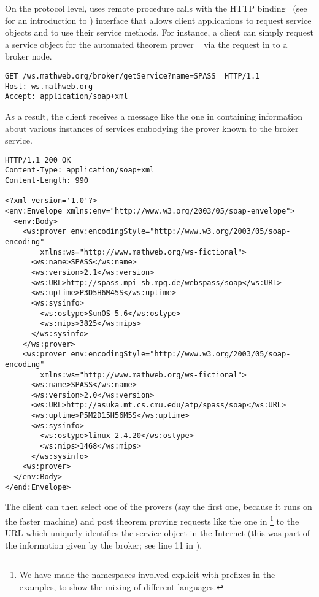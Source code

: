 \begin{omgroup}[id=rpc,short=Communication between Systems]
On the protocol level, {\mathwebws} uses {\soap} remote procedure calls with the HTTP
binding~\cite{GudHad:soapad03} (see~\cite{Mitra:soapPrimer03} for an introduction to
{\soap}) interface that allows client applications to request service objects and to use
their service methods. For instance, a client can simply request a service object for the
automated theorem prover {\spass}~\cite{Weidenbach:sv97} via the {\http} {}
request in {} to a {\mathwebws} broker node.

\begin{lstlisting}[label=lst:discover-spass,
          caption={Discovering Automated Theorem Provers (Request)}]
GET /ws.mathweb.org/broker/getService?name=SPASS  HTTP/1.1
Host: ws.mathweb.org
Accept: application/soap+xml
\end{lstlisting}

As a result, the client receives a {\soap} message like the one in
{} containing information about various instances of
services embodying the {\spass} prover known to the broker service.

\begin{lstlisting}[label=lst:rpc-spass,
          caption={Discovering Automated Theorem Provers (Response)}]
HTTP/1.1 200 OK
Content-Type: application/soap+xml
Content-Length: 990

<?xml version='1.0'?>
<env:Envelope xmlns:env="http://www.w3.org/2003/05/soap-envelope">
  <env:Body>
    <ws:prover env:encodingStyle="http://www.w3.org/2003/05/soap-encoding"
        xmlns:ws="http://www.mathweb.org/ws-fictional">
      <ws:name>SPASS</ws:name>
      <ws:version>2.1</ws:version>
      <ws:URL>http://spass.mpi-sb.mpg.de/webspass/soap</ws:URL>
      <ws:uptime>P3D5H6M45S</ws:uptime>
      <ws:sysinfo>
        <ws:ostype>SunOS 5.6</ws:ostype>
        <ws:mips>3825</ws:mips>
      </ws:sysinfo>
    </ws:prover>
    <ws:prover env:encodingStyle="http://www.w3.org/2003/05/soap-encoding"
        xmlns:ws="http://www.mathweb.org/ws-fictional">
      <ws:name>SPASS</ws:name>
      <ws:version>2.0</ws:version>
      <ws:URL>http://asuka.mt.cs.cmu.edu/atp/spass/soap</ws:URL>
      <ws:uptime>P5M2D15H56M5S</ws:uptime>
      <ws:sysinfo>
        <ws:ostype>linux-2.4.20</ws:ostype>
        <ws:mips>1468</ws:mips>
      </ws:sysinfo>
    <ws:prover>
  </env:Body>
</end:Envelope>
\end{lstlisting}

The client can then select one of the provers (say the first one, because it runs
on the faster machine) and post theorem proving requests like the one in
{}\footnote{We have made the namespaces involved explicit
  with prefixes in the examples, to show the mixing of different {\xml}
  languages.} to the URL which uniquely identifies the service object in the
Internet (this was part of the information given by the broker; see line 11 in
{}).


\end{omgroup}
